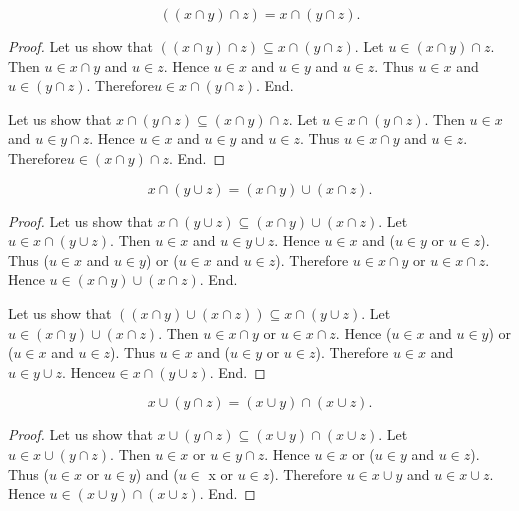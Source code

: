 \documentclass[../../sets-and-functions.ftl.tex]{subfiles}
\begin{document}
\begin{forthel}
    \begin{proposition}[SF 01 01 368359]
      $$((x \cap y) \cap z) = x \cap (y \cap z).$$
    \end{proposition}
    \begin{proof}
      Let us show that $((x \cap y) \cap z) \subseteq x \cap (y \cap z)$.
        Let $u \in (x \cap y) \cap z$.
        Then $u \in x \cap y$ and $u \in z$.
        Hence $u \in x$ and $u \in y$ and $u \in z$.
        Thus $u \in x$ and $u \in (y \cap z)$.
        Therefore$ u \in x \cap (y \cap z)$.
      End.

      Let us show that $x \cap (y \cap z) \subseteq (x \cap y) \cap z$.
        Let $u \in x \cap (y \cap z)$.
        Then $u \in x$ and $u \in y \cap z$.
        Hence $u \in x$ and $u \in y$ and $u \in z$.
        Thus $u \in x \cap y$ and $u \in z$.
        Therefore$ u \in (x \cap y) \cap z$.
      End.
    \end{proof}

    \begin{proposition}[SF 01 01 106755]
      $$x \cap (y \cup z) = (x \cap y) \cup (x \cap z).$$
    \end{proposition}
    \begin{proof}
      Let us show that $x \cap (y \cup z) \subseteq (x \cap y) \cup (x \cap z)$.
        Let $u \in x \cap (y \cup z)$.
        Then $u \in x$ and $u \in y \cup z$.
        Hence $u \in x$ and ($u \in y$ or $u \in z$).
        Thus ($u \in x$ and $u \in y$) or ($u \in x$ and $u \in z$).
        Therefore $u \in x \cap y$ or $u \in x \cap z$.
        Hence $u \in (x \cap y) \cup (x \cap z)$.
      End.

      Let us show that $((x \cap y) \cup (x \cap z)) \subseteq x \cap (y \cup z)$.
        Let $u \in (x \cap y) \cup (x \cap z)$.
        Then $u \in x \cap y$ or $u \in x \cap z$.
        Hence ($u \in x$ and $u \in y$) or ($u \in x$ and $u \in z$).
        Thus $u \in x$ and ($u \in y$ or $u \in z$).
        Therefore $u \in x$ and $u \in y \cup z$.
        Hence$ u \in x \cap (y \cup z)$.
      End.
    \end{proof}

    \begin{proposition}[SF 01 01 836290]
      $$x \cup (y \cap z) = (x \cup y) \cap (x \cup z).$$
    \end{proposition}
    \begin{proof}
      Let us show that $x \cup (y \cap z) \subseteq (x \cup y) \cap (x \cup z)$.
        Let $u \in x \cup (y \cap z)$.
        Then $u \in x$ or $u \in y \cap z$.
        Hence $u \in x$ or ($u \in y$ and $u \in z$).
        Thus ($u \in x$ or $u \in y$) and ($u \in$ x or $u \in z$).
        Therefore $u \in x \cup y$ and $u \in x \cup z$.
        Hence $u \in (x \cup y) \cap (x \cup z)$.
      End.


\end{proof}
\end{forthel}
\end{document}
